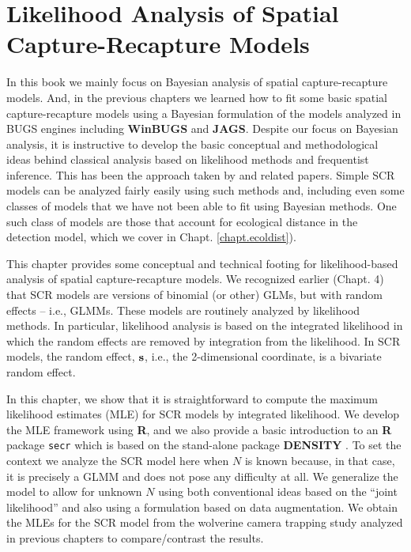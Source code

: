 \chapter{
Likelihood Analysis of Spatial Capture-Recapture Models
}
\label{chapt.mle}


\vspace{.3in}



In this book we mainly focus on Bayesian analysis of spatial
capture-recapture models. And, in the previous chapters we learned how
to fit some basic spatial capture-recapture models using a Bayesian
formulation of the models analyzed in BUGS engines including {\bf
  WinBUGS} and {\bf JAGS}.  Despite our focus on Bayesian analysis, it
is instructive to develop the basic conceptual and methodological
ideas behind classical analysis based on likelihood methods and
frequentist inference.  
This has been the approach taken by
\citet{borchers_efford:2008, dawson_efford:2009} and related papers.
Simple SCR models can be analyzed
fairly easily using such methods and, including even some classes of
models that we have not been able to fit using Bayesian methods. One
such class of models are those
that account for ecological distance in the detection model,
which we cover in  Chapt. \ref{chapt.ecoldist}).


This chapter provides some conceptual and technical footing for
likelihood-based analysis of spatial capture-recapture models. We
recognized earlier (Chapt. 4) that SCR models are versions of
binomial (or other) GLMs, but with random effects – i.e., GLMMs. These
models are 
routinely analyzed by likelihood methods. In particular, likelihood
analysis is based on the integrated likelihood in which the random
effects are removed by integration from the likelihood. In SCR models,
the random effect, ${\bf s}$, i.e., the 2-dimensional coordinate, is a
bivariate random effect. 

In this chapter, we show that it is
straightforward to compute the maximum likelihood estimates (MLE) for
SCR models by integrated likelihood. We develop the MLE framework
using {\bf R}, and we also provide a basic introduction to an {\bf R} package
\mbox{\tt secr} \citep{efford:2011} which is based on the stand-alone
package 
{\bf DENSITY} \citep{efford_etal:2004}.
 To set the context we analyze the SCR model
here when $N$ is known because, in that case, it is precisely a GLMM and
does not pose any difficulty at all. We generalize the model to allow
for unknown $N$ using both conventional ideas based on the ``joint
likelihood'' \citep[e.g.,][]{borchers_etal:2002}
and also using a formulation
based on data augmentation.  We obtain the MLEs for 
the SCR model from the wolverine camera trapping study \citep{magoun_etal:2011}
 analyzed in previous chapters to compare/contrast the
results.

